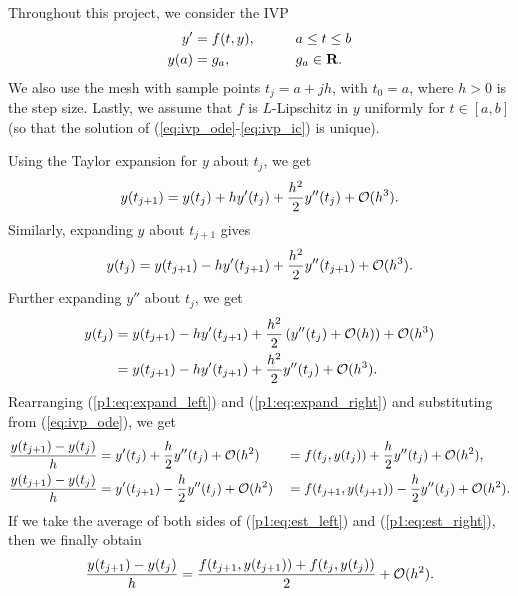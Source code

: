 \documentclass{homework}
\begin{document}
	\maketitle
	
	Throughout this project, we consider the IVP
	\begin{alignat}{2}
		\label{eq:ivp_ode}
		y' &= f(t, y),&\qquad &a \le t \le b\\
		\label{eq:ivp_ic}
		y(a) &= g_a,&\qquad &g_a \in \textbf{R}.
	\end{alignat}
	We also use the mesh with sample points $t_j = a + jh$, with $t_0 = a$, where $h > 0$ is the step size. Lastly, we assume that $f$ is $L$-Lipschitz in $y$ uniformly for $t \in [a,b]$ (so that the solution of (\ref{eq:ivp_ode}-\ref{eq:ivp_ic}) is unique).
	
	\question
	Using the Taylor expansion for $y$ about $t_j$, we get
	\begin{equation}
		\label{p1:eq:expand_right}
		y(t_{j+1}) = y(t_j) + hy'(t_j) + \frac{h^2}{2}y''(t_j) + \mathcal{O}(h^3).
	\end{equation}
	Similarly, expanding $y$ about $t_{j+1}$ gives
	\begin{equation}
		y(t_j) = y(t_{j+1}) - hy'(t_{j+1}) + \frac{h^2}{2}y''(t_{j+1}) + \mathcal{O}(h^3).
	\end{equation}
	Further expanding $y''$ about $t_j$, we get
	\begin{align}
		y(t_j) &= y(t_{j+1}) - hy'(t_{j+1}) + \frac{h^2}{2}\left(y''(t_j) + \mathcal{O}(h)\right) + \mathcal{O}(h^3) \\
		\label{p1:eq:expand_left}
		&= y(t_{j+1}) - hy'(t_{j+1}) + \frac{h^2}{2}y''(t_j) + \mathcal{O}(h^3).
	\end{align}
	Rearranging (\ref{p1:eq:expand_left}) and (\ref{p1:eq:expand_right}) and substituting from (\ref{eq:ivp_ode}), we get
	\begin{alignat}{2}
		\label{p1:eq:est_left}
		\frac{y(t_{j+1}) - y(t_j)}{h} &= y'(t_j) + \frac{h}{2}y''(t_j) + \mathcal{O}(h^2)&& = f(t_j, y(t_j)) + \frac{h}{2} y''(t_j) + \mathcal{O}(h^2), \\
		\label{p1:eq:est_right}
		\frac{y(t_{j+1}) - y(t_j)}{h} &= y'(t_{j+1}) - \frac{h}{2}y''(t_j) + \mathcal{O}(h^2)&& = f(t_{j+1}, y(t_{j+1})) - \frac{h}{2}y''(t_j) + \mathcal{O}(h^2).
	\end{alignat}
	If we take the average of both sides of (\ref{p1:eq:est_left}) and (\ref{p1:eq:est_right}), then we finally obtain
	\begin{equation}
		\frac{y(t_{j+1}) - y(t_j)}{h} = \frac{f(t_{j+1}, y(t_{j+1})) + f(t_j, y(t_j))}{2} + \mathcal{O}(h^2).
	\end{equation}
\end{document}
